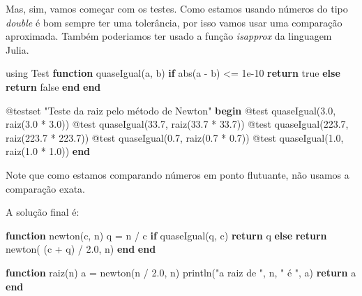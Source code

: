 \documentclass[
  letterpaper,
  DIV=11,
  numbers=noendperiod]{scrreprt}
\newenvironment{Shaded}{\begin{snugshade}}{\end{snugshade}}
\newcommand{\BuiltInTok}[1]{\textcolor[rgb]{0.00,0.23,0.31}{#1}}
\newcommand{\ConstantTok}[1]{\textcolor[rgb]{0.56,0.35,0.01}{#1}}
\newcommand{\ControlFlowTok}[1]{\textcolor[rgb]{0.00,0.23,0.31}{\textbf{#1}}}
\newcommand{\FloatTok}[1]{\textcolor[rgb]{0.68,0.00,0.00}{#1}}
\newcommand{\FunctionTok}[1]{\textcolor[rgb]{0.28,0.35,0.67}{#1}}
\newcommand{\ImportTok}[1]{\textcolor[rgb]{0.00,0.46,0.62}{#1}}
\newcommand{\KeywordTok}[1]{\textcolor[rgb]{0.00,0.23,0.31}{\textbf{#1}}}
\newcommand{\NormalTok}[1]{\textcolor[rgb]{0.00,0.23,0.31}{#1}}
\newcommand{\OperatorTok}[1]{\textcolor[rgb]{0.37,0.37,0.37}{#1}}
\newcommand{\PreprocessorTok}[1]{\textcolor[rgb]{0.68,0.00,0.00}{#1}}
\newcommand{\StringTok}[1]{\textcolor[rgb]{0.13,0.47,0.30}{#1}}
\begin{document}
Mas, sim, vamos começar com os testes. Como estamos usando números do
tipo \emph{double} é bom sempre ter uma tolerância, por isso vamos usar
uma comparação aproximada. Também poderiamos ter usado a função
\emph{isapprox} da linguagem Julia.

\begin{Shaded}
\begin{Highlighting}[]
\ImportTok{using} \BuiltInTok{Test}
\KeywordTok{function} \FunctionTok{quaseIgual}\NormalTok{(a, b)}
    \ControlFlowTok{if} \FunctionTok{abs}\NormalTok{(a }\OperatorTok{{-}}\NormalTok{ b) }\OperatorTok{\textless{}=} \FloatTok{1e{-}10}
        \ControlFlowTok{return} \ConstantTok{true}
    \ControlFlowTok{else}
        \ControlFlowTok{return} \ConstantTok{false}
    \ControlFlowTok{end}
\KeywordTok{end}


\PreprocessorTok{@testset} \StringTok{"Teste da raiz pelo método de Newton"} \ControlFlowTok{begin}
    \PreprocessorTok{@test} \FunctionTok{quaseIgual}\NormalTok{(}\FloatTok{3.0}\NormalTok{, }\FunctionTok{raiz}\NormalTok{(}\FloatTok{3.0} \OperatorTok{*} \FloatTok{3.0}\NormalTok{))}
    \PreprocessorTok{@test} \FunctionTok{quaseIgual}\NormalTok{(}\FloatTok{33.7}\NormalTok{, }\FunctionTok{raiz}\NormalTok{(}\FloatTok{33.7} \OperatorTok{*} \FloatTok{33.7}\NormalTok{))}
    \PreprocessorTok{@test} \FunctionTok{quaseIgual}\NormalTok{(}\FloatTok{223.7}\NormalTok{, }\FunctionTok{raiz}\NormalTok{(}\FloatTok{223.7} \OperatorTok{*} \FloatTok{223.7}\NormalTok{))}
    \PreprocessorTok{@test} \FunctionTok{quaseIgual}\NormalTok{(}\FloatTok{0.7}\NormalTok{, }\FunctionTok{raiz}\NormalTok{(}\FloatTok{0.7} \OperatorTok{*} \FloatTok{0.7}\NormalTok{))}
    \PreprocessorTok{@test} \FunctionTok{quaseIgual}\NormalTok{(}\FloatTok{1.0}\NormalTok{, }\FunctionTok{raiz}\NormalTok{(}\FloatTok{1.0} \OperatorTok{*} \FloatTok{1.0}\NormalTok{))}
\ControlFlowTok{end}
\end{Highlighting}
\end{Shaded}

Note que como estamos comparando números em ponto flutuante, não usamos
a comparação exata.

A solução final é:

\begin{Shaded}
\begin{Highlighting}[]
\KeywordTok{function} \FunctionTok{newton}\NormalTok{(c, n)}
\NormalTok{    q }\OperatorTok{=}\NormalTok{ n }\OperatorTok{/}\NormalTok{ c}
    \ControlFlowTok{if} \FunctionTok{quaseIgual}\NormalTok{(q, c)}
        \ControlFlowTok{return}\NormalTok{ q}
    \ControlFlowTok{else}
        \ControlFlowTok{return} \FunctionTok{newton}\NormalTok{( (c }\OperatorTok{+}\NormalTok{ q) }\OperatorTok{/} \FloatTok{2.0}\NormalTok{, n)}
    \ControlFlowTok{end}
\KeywordTok{end}


\KeywordTok{function} \FunctionTok{raiz}\NormalTok{(n)}
\NormalTok{    a }\OperatorTok{=}  \FunctionTok{newton}\NormalTok{(n }\OperatorTok{/} \FloatTok{2.0}\NormalTok{, n)}
    \FunctionTok{println}\NormalTok{(}\StringTok{"a raiz de "}\NormalTok{, n, }\StringTok{" é "}\NormalTok{, a)}
    \ControlFlowTok{return}\NormalTok{ a}
\KeywordTok{end}
\end{Highlighting}
\end{Shaded}
\end{document}
